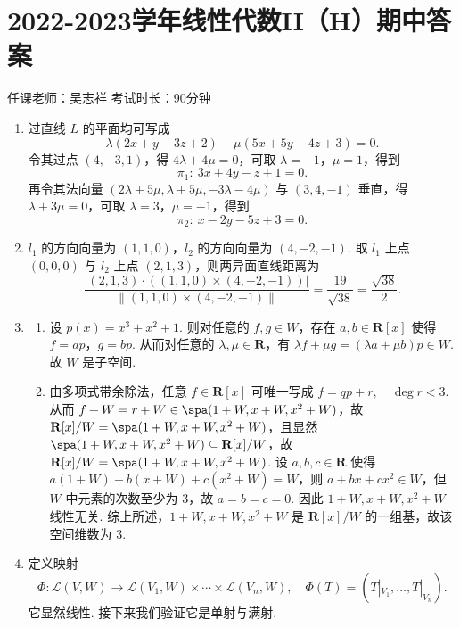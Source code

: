 \section{2022-2023学年线性代数II（H）期中答案}

\begin{center}
    任课老师：吴志祥\hspace{4em} 考试时长：90分钟
\end{center}
\begin{enumerate}
    \item 过直线 $L$ 的平面均可写成
    \[
        \lambda(2x+y-3z+2)+\mu(5x+5y-4z+3)=0.
    \]
    令其过点 $(4,-3,1)$，得 $4\lambda+4\mu=0$，可取 $\lambda= -1$，$\mu=1$，得到
    \[
        \pi_1:\ 3x+4y-z+1=0.
    \]
    再令其法向量 $(2\lambda + 5\mu, \lambda + 5\mu, -3\lambda - 4\mu)$ 与 $(3,4,-1)$ 垂直，得 $\lambda + 3\mu=0$，可取 $\lambda=3$，$\mu=-1$，得到
    \[
        \pi_2:\ x-2y-5z+3=0.
    \]

    \item $l_1$ 的方向向量为 $(1,1,0)$，$l_2$ 的方向向量为 $(4,-2,-1)$. 取 $l_1$ 上点 $(0,0,0)$ 与 $l_2$ 上点 $(2,1,3)$，则两异面直线距离为
    \[
        \frac{|(2,1,3)\cdot((1,1,0)\times(4,-2,-1))|}
        {\|(1,1,0)\times(4,-2,-1)\|}
        =
        \frac{19}{\sqrt{38}}=\frac{\sqrt{38}}{2}.
    \]

    \item
    \begin{enumerate}
        \item 设 $p(x)=x^3+x^2+1$. 则对任意的 $f, g \in W$，存在 $a, b \in \mathbf{R}[x]$ 使得 $f=ap$，$g=bp$. 从而对任意的 $\lambda, \mu \in \mathbf{R}$，有 $\lambda f + \mu g = (\lambda a + \mu b)p \in W$. 故 $W$ 是子空间.

        \item 由多项式带余除法，任意 $f\in\mathbf{R}[x]$ 可唯一写成 $f=qp+r,\quad \deg r<3$. 从而 $f+W=r+W \in \spa(1+W, x+W, x^2+W)$，故 $\mathbf{R}[x]/W=\spa(1+W, x+W, x^2+W)$，且显然 $\spa(1+W, x+W, x^2+W) \subseteq \mathbf{R}[x]/W$，故 $\mathbf{R}[x]/W=\spa(1+W, x+W, x^2+W)$. 设 $a, b, c \in \mathbf{R}$ 使得 $a(1+W)+b(x+W)+c(x^2+W)=W$，则 $a+bx+cx^2\in W$，但 $W$ 中元素的次数至少为 $3$，故 $a=b=c=0$. 因此 $1+W, x+W, x^2+W$ 线性无关. 综上所述，$1+W, x+W, x^2+W$ 是 $\mathbf{R}[x]/W$ 的一组基，故该空间维数为 $3$.
    \end{enumerate}

    \item 定义映射
    \[
        \Phi:\mathcal{L}(V,W)\to
        \mathcal{L}(V_1,W)\times\cdots\times\mathcal{L}(V_n,W),
        \quad
        \Phi(T)=(T|_{V_1},\ldots,T|_{V_n}).
    \]
    它显然线性. 接下来我们验证它是单射与满射.


\end{enumerate}
